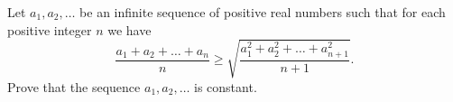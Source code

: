 Let $a_1,a_2,\dots$ be an infinite sequence of positive real numbers such that for each positive integer $n$ we have
\[
	\frac{a_1+a_2+\dots+a_n}{n}\geq\sqrt{\frac{a_1^2+a_2^2+\dots+a_{n+1}^2}{n+1}}.
\]
Prove that the sequence $a_1,a_2,\dots$ is constant.
